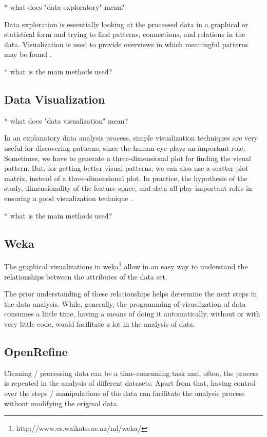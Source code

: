 \documentclass[12pt,a4paper]{amsart}
\numberwithin{equation}{section}
\theoremstyle{plain}
\theoremstyle{definition}
\begin{document}
* what does "data exploratory" mean?

Data exploration is essentially looking at the processed data in a graphical or statistical form and trying to find patterns, connections, and relations in the data. Visualization is used to provide overviews in which meaningful patterns may be found \cite{cuesta2016practical}.

* what is the main methods used?

\subsection{Data Visualization}\label{data-visualization}

* what does "data visualization" mean?

In an explanatory data analysis process, simple visualization techniques are very useful for discovering patterns, since the human eye plays an important role. Sometimes, we have to generate a three-dimensional plot for finding the visual pattern. But, for getting better visual patterns, we can also use a scatter plot matrix, instead of a three-dimensional plot. In practice, the hypothesis of the study, dimensionality of the feature space, and data all play important roles in ensuring a good visualization technique \cite{cuesta2016practical}.

* what is the main methods used?

\subsection{Weka}\label{weka}

The graphical visualizations in weka\footnote{http://www.cs.waikato.ac.nz/ml/weka/} allow in an easy way to understand the relationships between the attributes of the data set.

The prior understanding of these relationships helps determine the next steps in the data analysis. While, generally, the programming of visualization of data consumes a little time, having a means of doing it automatically, without or with very little code, would facilitate a lot in the analysis of data.

\subsection{OpenRefine}\label{openrefine}

Cleaning / processing data can be a time-consuming task and, often, the process is repeated in the analysis of different datasets. Apart from that, having control over the steps / manipulations of the data can facilitate the analysis process without modifying the original data.
\end{document}
